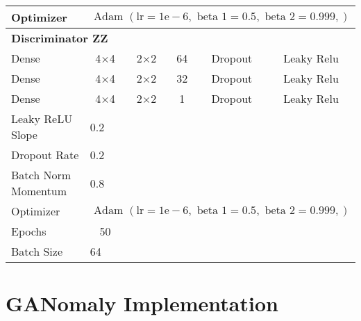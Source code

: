 \begin{longtable}[c]{@{}lccccc@{}}
	Optimizer & \multicolumn{5}{l}{$\text { Adam }(\mathrm{lr}=1 \mathrm{e}-6, \text { beta } 1=0.5, \text { beta } 2=0.999,)$} \\ \hline
	\multicolumn{6}{l}{\textbf{Discriminator ZZ}} \\
	Dense & \multicolumn{1}{c}{4$\times$4} & 2$\times$2 & 64 & Dropout & Leaky Relu \\
	Dense & \multicolumn{1}{c}{4$\times$4} & 2$\times$2 & 32 & Dropout & Leaky Relu \\
	Dense & \multicolumn{1}{c}{4$\times$4} & 2$\times$2 & 1 & Dropout & Leaky Relu \\ \hline
	Leaky ReLU Slope & \multicolumn{5}{l}{0.2} \\
	Dropout Rate & \multicolumn{5}{l}{0.2} \\
	Batch Norm Momentum & \multicolumn{5}{l}{0.8} \\
	Optimizer & \multicolumn{5}{l}{$\text { Adam }(\mathrm{lr}=1 \mathrm{e}-6, \text { beta } 1=0.5, \text { beta } 2=0.999,)$} \\ \hline
	Epochs & 50 & \multicolumn{1}{l}{} & \multicolumn{1}{l}{} & \multicolumn{1}{l}{} & \multicolumn{1}{l}{} \\
	Batch Size & \multicolumn{5}{l}{64}
\end{longtable}


\section{GANomaly Implementation}


